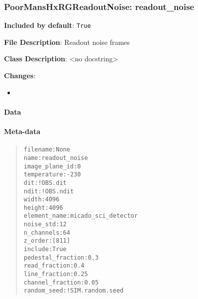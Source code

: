 \subsubsection{PoorMansHxRGReadoutNoise: \textquotedbl{}readout\_noise\textquotedbl{}%
  \label{poormanshxrgreadoutnoise-readout-noise}%
}

\textbf{Included by default}: \texttt{True}

\textbf{File Description}: Readout noise frames

\textbf{Class Description}: <no docstring>

\textbf{Changes}:

\begin{itemize}
\item \end{itemize}


\paragraph{Data%
  \label{id9}%
}


\paragraph{Meta-data%
  \label{id10}%
}

\begin{quote}
\begin{alltt}
         filename : None
             name : readout_noise
   image_plane_id : 0
      temperature : -230
              dit : !OBS.dit
             ndit : !OBS.ndit
            width : 4096
           height : 4096
     element_name : micado_sci_detector
        noise_std : 12
       n_channels : 64
          z_order : [811]
          include : True
pedestal_fraction : 0.3
    read_fraction : 0.4
    line_fraction : 0.25
 channel_fraction : 0.05
      random_seed : !SIM.random.seed
\end{alltt}
\end{quote}
